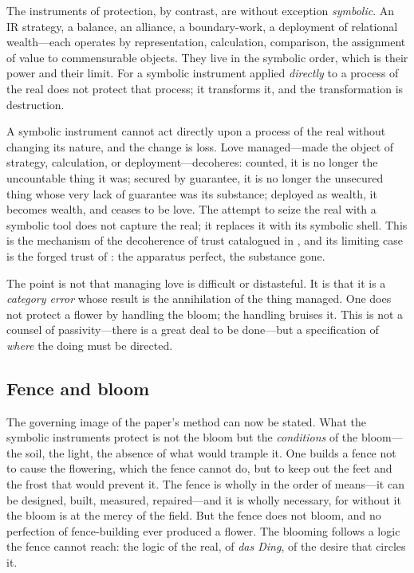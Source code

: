 The instruments of protection, by contrast, are without exception \emph{symbolic}. An IR strategy, a balance, an alliance, a boundary-work, a deployment of relational wealth---each operates by representation, calculation, comparison, the assignment of value to commensurable objects. They live in the symbolic order, which is their power and their limit. For a symbolic instrument applied \emph{directly} to a process of the real does not protect that process; it transforms it, and the transformation is destruction.

\begin{claim}
A symbolic instrument cannot act directly upon a process of the real without changing its nature, and the change is loss. Love managed---made the object of strategy, calculation, or deployment---decoheres: counted, it is no longer the uncountable thing it was; secured by guarantee, it is no longer the unsecured thing whose very lack of guarantee was its substance; deployed as wealth, it becomes wealth, and ceases to be love. The attempt to seize the real with a symbolic tool does not capture the real; it replaces it with its symbolic shell. This is the mechanism of the decoherence of trust catalogued in , and its limiting case is the forged trust of \textcite{paperxiii}: the apparatus perfect, the substance gone.
\end{claim}

\noindent
The point is not that managing love is difficult or distasteful. It is that it is a \emph{category error} whose result is the annihilation of the thing managed. One does not protect a flower by handling the bloom; the handling bruises it. This is not a counsel of passivity---there is a great deal to be done---but a specification of \emph{where} the doing must be directed.

\subsection{Fence and bloom}
\label{p17:sub:conditions-fence}

The governing image of the paper's method can now be stated. What the symbolic instruments protect is not the bloom but the \emph{conditions} of the bloom---the soil, the light, the absence of what would trample it. One builds a fence not to cause the flowering, which the fence cannot do, but to keep out the feet and the frost that would prevent it. The fence is wholly in the order of means---it can be designed, built, measured, repaired---and it is wholly necessary, for without it the bloom is at the mercy of the field. But the fence does not bloom, and no perfection of fence-building ever produced a flower. The blooming follows a logic the fence cannot reach: the logic of the real, of \emph{das Ding}, of the desire that circles it.

